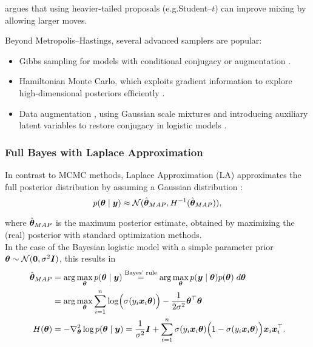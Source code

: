 \citep{scott_data_2011} argues that using heavier-tailed proposals (e.g.\@ Student–$t$) can improve mixing by allowing larger moves.\\

Beyond Metropolis–Hastings, several advanced samplers are popular:

\begin{itemize}
    \item Gibbs sampling for models with conditional conjugacy or augmentation \citep{dellaportas_bayesian_1993}.
    \item Hamiltonian Monte Carlo, which exploits gradient information to explore high‐dimensional posteriors efficiently \citep{neal_probabilistic_1993}.
    \item Data augmentation \citep{albert_bayesian_1993}, using Gaussian scale mixtures and introducing auxiliary latent variables to restore conjugacy in logistic models \citep{holmes_efficient_nodate,fruhwirth-schnatter_auxiliary_2007,scott_data_2011}.
\end{itemize}

\subsubsection*{Full Bayes with Laplace Approximation}

In contrast to MCMC methods, Laplace Approximation (LA) approximates the full posterior distribution by assuming a Gaussian distribution \citep{tierney_accurate_1986}:
\begin{equation*}
    p(\bm{\theta} \mid \bm{y}) \approx \mathcal{N}(\hat{\bm{\theta}}_{MAP}, H^{-1}(\hat{\bm{\theta}}_{MAP})),
\end{equation*}

where $\hat{\bm{\theta}}_{MAP}$ is the maximum posterior estimate, obtained by maximizing the (real) posterior with standard optimization methods.\\

In the case of the Bayesian logistic model with a simple parameter prior $\bm{\theta} \sim \mathcal{N}(\bm{0}, \sigma^2 \bm{I})$, this results in
\begin{equation*}
    \begin{aligned}
        \hat{\bm{\theta}}_{MAP} &= \arg \max_{\bm{\theta}} p(\bm{\theta} \mid \bm{y})
            \overset{\text{Bayes' rule}}{=} \arg \max_{\bm{\theta}} p(\bm{y} \mid \bm{\theta}) p(\bm{\theta}) \; d\bm{\theta}  \\
            &= \arg \max_{\bm{\theta}} \sum_{i = 1}^n \log \Bigl( \sigma(y_i \bm{x}_i\bm{\theta})\Bigr) - \frac{1}{2 \sigma^2} \bm{\theta}^\top \bm{\theta} \\
        H(\bm{\theta}) &= - \nabla^2_{\bm{\theta}}  \log p (\bm{\theta} \mid \bm{y}) = \frac{1}{\sigma^2} \bm{I} + \sum_{i = 1}^n
        \sigma(y_i \bm{x}_i\bm{\theta}) \Bigl(1 - \sigma(y_i \bm{x}_i\bm{\theta})\Bigr)
            \bm{x}_i \bm{x}_i^\top.
    \end{aligned}
\end{equation*}

